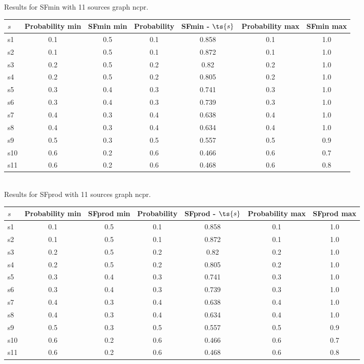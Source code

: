 \documentclass{article}
\begin{document}
\noindent Results for SFmin with 11 sources graph ncpr.

\noindent\begin{tabular}{|l|c|c|c|c|c|c|}
\hline
$s$& Probability min & SFmin min & Probability & SFmin - $\ts{s}$ & Probability max & SFmin max\\
\hline
s1 &0.1 & 0.5 & 0.1 & 0.858 & 0.1 & 1.0\\
\hline
s2 &0.1 & 0.5 & 0.1 & 0.872 & 0.1 & 1.0\\
\hline
s3 &0.2 & 0.5 & 0.2 & 0.82 & 0.2 & 1.0\\
\hline
s4 &0.2 & 0.5 & 0.2 & 0.805 & 0.2 & 1.0\\
\hline
s5 &0.3 & 0.4 & 0.3 & 0.741 & 0.3 & 1.0\\
\hline
s6 &0.3 & 0.4 & 0.3 & 0.739 & 0.3 & 1.0\\
\hline
s7 &0.4 & 0.3 & 0.4 & 0.638 & 0.4 & 1.0\\
\hline
s8 &0.4 & 0.3 & 0.4 & 0.634 & 0.4 & 1.0\\
\hline
s9 &0.5 & 0.3 & 0.5 & 0.557 & 0.5 & 0.9\\
\hline
s10 &0.6 & 0.2 & 0.6 & 0.466 & 0.6 & 0.7\\
\hline
s11 &0.6 & 0.2 & 0.6 & 0.468 & 0.6 & 0.8\\
\hline
\end{tabular}\\

\noindent Results for SFprod with 11 sources graph ncpr.

\noindent\begin{tabular}{|l|c|c|c|c|c|c|}
\hline
$s$& Probability min & SFprod min & Probability & SFprod - $\ts{s}$ & Probability max & SFprod max\\
\hline
s1 &0.1 & 0.5 & 0.1 & 0.858 & 0.1 & 1.0\\
\hline
s2 &0.1 & 0.5 & 0.1 & 0.872 & 0.1 & 1.0\\
\hline
s3 &0.2 & 0.5 & 0.2 & 0.82 & 0.2 & 1.0\\
\hline
s4 &0.2 & 0.5 & 0.2 & 0.805 & 0.2 & 1.0\\
\hline
s5 &0.3 & 0.4 & 0.3 & 0.741 & 0.3 & 1.0\\
\hline
s6 &0.3 & 0.4 & 0.3 & 0.739 & 0.3 & 1.0\\
\hline
s7 &0.4 & 0.3 & 0.4 & 0.638 & 0.4 & 1.0\\
\hline
s8 &0.4 & 0.3 & 0.4 & 0.634 & 0.4 & 1.0\\
\hline
s9 &0.5 & 0.3 & 0.5 & 0.557 & 0.5 & 0.9\\
\hline
s10 &0.6 & 0.2 & 0.6 & 0.466 & 0.6 & 0.7\\
\hline
s11 &0.6 & 0.2 & 0.6 & 0.468 & 0.6 & 0.8\\
\hline
\end{tabular}\\
\end{document}
